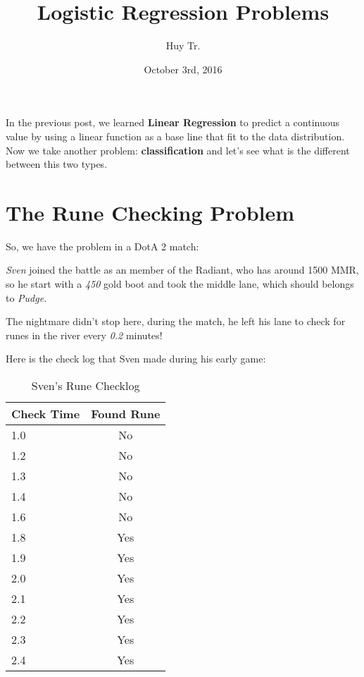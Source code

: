 \documentclass{article}
\title{Logistic Regression Problems}
\author{Huy Tr.}
\date{October 3rd, 2016}
\begin{document}
\maketitle

In the previous post, we learned \textbf{Linear Regression} to predict a continuous value by using a linear function as a base line that fit to the data distribution. Now we take another problem: \textbf{classification} and let's see what is the different between this two types.

\section{The Rune Checking Problem}

\begin{flushleft}
So, we have the problem in a DotA 2 match:
\end{flushleft}

\begin{flushleft}
\textit{Sven} joined the battle as an member of the Radiant, who has around 1500 MMR, so he start with a \textit{450} gold boot and took the middle lane, which should belongs to \textit{Pudge}.
\end{flushleft}

\begin{flushleft}
The nightmare didn't stop here, during the match, he left his lane to check for runes in the river every \textit{0.2} minutes!
\end{flushleft}

\begin{flushleft}
Here is the check log that Sven made during his early game:
\end{flushleft}

\begin{table}[h]
\centering
\caption{Sven's Rune Checklog}
\label{rune-check-table}
\begin{tabular}{|l|c|}
\hline
Check Time & Found Rune \\
\hline
1.0        & No         \\
1.2        & No         \\
1.3        & No         \\
1.4        & No         \\
1.6        & No         \\
1.8        & Yes        \\
1.9        & Yes        \\
2.0        & Yes        \\
2.1        & Yes        \\
2.2        & Yes        \\
2.3        & Yes        \\
2.4        & Yes        \\
\hline
\end{tabular}
\end{table}
\end{document}
